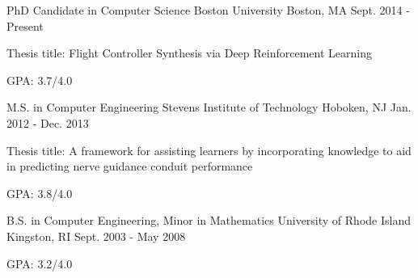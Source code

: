 

\begin{cventries}
  \cventry
    {PhD Candidate in Computer Science} %
    {Boston University} %
    {Boston, MA} %
    {Sept. 2014 - Present} %
    {
      \begin{cvitems} %
        \item {Thesis title: Flight Controller Synthesis via Deep Reinforcement Learning}
        \item {GPA: 3.7/4.0}
      \end{cvitems}
    }

  \cventry
    {M.S. in Computer Engineering} %
    {Stevens Institute of Technology} %
    {Hoboken, NJ} %
    {Jan. 2012 - Dec. 2013} %
    {
      \begin{cvitems} %
        \item {Thesis title: A framework for assisting learners by incorporating knowledge to aid in predicting nerve guidance conduit performance}
        \item {GPA: 3.8/4.0}
      \end{cvitems}
    }


  \cventry
    {B.S. in Computer Engineering, Minor in Mathematics} %
    {University of Rhode Island} %
    {Kingston, RI} %
    {Sept. 2003 - May 2008} %
    {
      \begin{cvitems} %
        \item {GPA: 3.2/4.0}
      \end{cvitems}
    }

\end{cventries}
